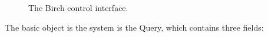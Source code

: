 \documentclass{article}
\begin{document}
\begin{figure}[ht!]
  \begin{center}
    \caption{The Birch control interface.}
    \label{figure:mainwindow}
  \end{center}
\end{figure}

The basic object is the system is the Query, which contains three
fields:
\end{document}
